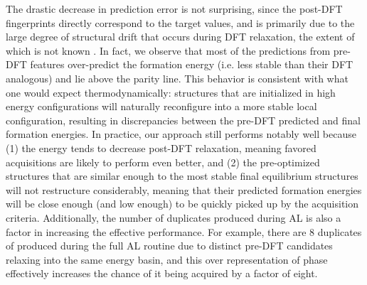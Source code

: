 %
%
%
The drastic decrease in prediction error is not surprising,
since the post-DFT fingerprints directly correspond to the target \DHf values,
and is primarily due to the large degree of structural drift that occurs during DFT relaxation,
the extent of which is not known .
%
In fact, we observe that most of the predictions from pre-DFT features over-predict the formation energy (i.e. less stable than their DFT analogous) and lie above the parity line.
%
This behavior is consistent with what one would expect thermodynamically:
structures that are initialized in high energy configurations will  naturally reconfigure into a more stable local configuration,
resulting in discrepancies between the pre-DFT predicted and final formation energies.
%
In practice, our approach still performs notably well because
(1) the energy tends to decrease post-DFT relaxation,
meaning favored acquisitions are likely to perform even better, and
(2) the pre-optimized structures that are similar enough to the most stable final equilibrium structures will not restructure considerably,
meaning that their predicted formation energies will be close enough (and low enough) to be quickly picked up by the acquisition criteria.
%
Additionally, the number of duplicates produced during AL is also a factor in increasing the effective performance.
%
For example, there are \num{8} duplicates of \aIrOthree produced during the full AL routine due to distinct pre-DFT candidates relaxing into the same energy basin,
and this over representation of \aIrOthree phase effectively increases the chance of it being acquired by a factor of eight.
